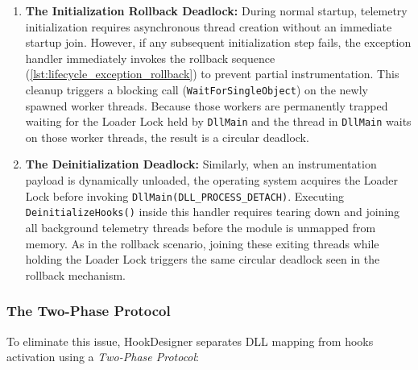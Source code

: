 \begin{enumerate}
	\item \textbf{The Initialization Rollback Deadlock:}
	During normal startup, telemetry initialization requires asynchronous thread creation without an immediate startup join.
	However, if any subsequent initialization step fails, the exception handler immediately invokes the rollback sequence (\cref{lst:lifecycle_exception_rollback}) to prevent partial instrumentation.
	This cleanup triggers a blocking call (\texttt{WaitForSingleObject}) on the newly spawned worker threads.
	Because those workers are permanently trapped waiting for the Loader Lock held by \texttt{DllMain} and the thread in \texttt{DllMain} waits on those worker threads, the result is a circular deadlock.
	
	\item \textbf{The Deinitialization Deadlock:}
	Similarly, when an instrumentation payload is dynamically unloaded, the operating system acquires the Loader Lock before invoking \texttt{DllMain(DLL\_PROCESS\_DETACH)}.
	Executing \texttt{DeinitializeHooks()} inside this handler requires tearing down and joining all background telemetry threads before the module is unmapped from memory.
	As in the rollback scenario, joining these exiting threads while holding the Loader Lock triggers the same circular deadlock seen in the rollback mechanism.
\end{enumerate}



\subsubsection{The Two-Phase Protocol}
\label{two-phase}

To eliminate this issue, HookDesigner separates DLL mapping from hooks activation using a \emph{Two-Phase Protocol}:

